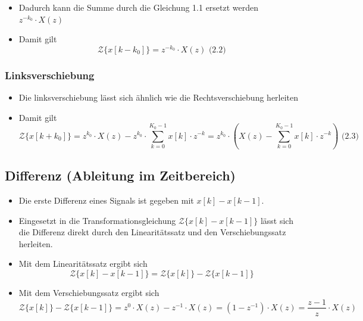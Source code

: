 \documentclass[11pt]{article}
\providecommand{\tightlist}{%
      \setlength{\itemsep}{0pt}\setlength{\parskip}{0pt}}
\begin{document}
    \begin{itemize}
\item
  Dadurch kann die Summe durch die Gleichung 1.1 ersetzt werden
  \(z^{-k_0} \cdot X(z)\)
\item
  Damit gilt
  \[\mathcal{Z}\{x[k-k_0]\} = z^{-k_0} \cdot X(z)\textrm{  (2.2)}\]
\end{itemize}

    \subsubsection{Linksverschiebung}\label{linksverschiebung}

\begin{itemize}
\item
  Die linksverschiebung lässt sich ähnlich wie die Rechtsverschiebung
  herleiten
\item
  Damit gilt
  \[\mathcal{Z}\{x[k+k_0]\} = z^{k_0} \cdot X(z) - z^{k_0} \cdot \sum_{k=0}^{K_0-1}x[k] \cdot z^{-k} = z^{k_0} \cdot (X(z) - \sum_{k=0}^{K_0-1}x[k] \cdot z^{-k})\textrm{  (2.3)}\]
\end{itemize}

    \subsection{Differenz (Ableitung im
Zeitbereich)}\label{differenz-ableitung-im-zeitbereich}

\begin{itemize}
\item
  Die erste Differenz eines Signals ist gegeben mit \(x[k] - x[k-1]\).
\item
  Eingesetzt in die Transformationsgleichung
  \(\mathcal{Z}\{x[k] - x[k-1]\}\) lässt sich die Differenz direkt durch
  den Linearitätssatz und den Verschiebungssatz herleiten.
\end{itemize}

    \begin{itemize}
\tightlist
\item
  Mit dem Linearitätssatz ergibt sich
  \[\mathcal{Z}\{x[k] - x[k-1]\} = \mathcal{Z}\{x[k]\} - \mathcal{Z}\{x[k-1]\}\]
\end{itemize}

    \begin{itemize}
\tightlist
\item
  Mit dem Verschiebungssatz ergibt sich
  \[\mathcal{Z}\{x[k]\} - \mathcal{Z}\{x[k-1]\} = z^0 \cdot X(z) - z^{-1} \cdot X(z) = (1-z^{-1}) \cdot X(z) = \frac{z-1}{z} \cdot X(z)\]
\end{itemize}
\end{document}
